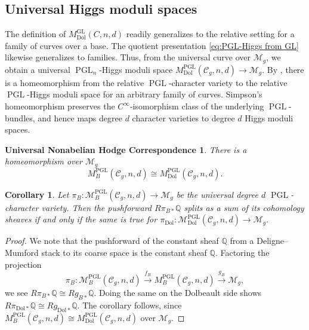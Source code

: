 \documentclass[11pt,reqno]{amsart}
\theoremstyle{plain} %
\newtheorem*{RNAHC}{Universal Nonabelian Hodge Correspondence}
\newtheorem{corollary}[theorem]{Corollary}
\theoremstyle{definition}
\newcommand{\QQ}{\mathbb{Q}}
\newcommand{\M}{\mathcal{M}}
\newcommand{\C}{\mathcal{C}}
\newcommand{\mc}{\mathcal}
\DeclareMathOperator{\GL}{GL}
\DeclareMathOperator{\PGL}{PGL}
\newcommand{\Dol}{\mathrm{Dol}}
\begin{document}
\subsection{Universal Higgs moduli spaces}
The definition of $M^{\GL}_{\Dol}(C,n,d)$ readily generalizes to the relative setting for a family of curves over a base. The quotient presentation \eqref{eq:PGL-Higgs from GL} likewise generalizes to families. Thus, from the universal curve over $\M_g$, we obtain a universal $\PGL_n$-Higgs moduli space $M^{\PGL}_{\Dol}(\mc C_g,n,d) \to \M_g.$ %
By \cite[Theorem~9.11 and Lemma~9.14]{Simpson-reps2}, there is a homeomorphism from the relative $\PGL$-character variety to the relative $\PGL$-Higgs moduli space for an arbitrary family of curves. Simpson's homeomorphism preserves the $C^\infty$-isomorphism class of the underlying $\PGL$-bundles, and hence maps degree $d$ character varieties to degree $d$ Higgs moduli spaces.


\begin{RNAHC} %
There is a homeomorphism  over $\M_g$ $$M_B^{\PGL}(\C_g, n, d) \cong M_\Dol^{\PGL}(\C_g,n,d).$$ %
\end{RNAHC}




\begin{corollary} \label{cor: switch to Dol}
    Let $\pi_B \colon \M^{\PGL}_B(\C_g,n,d) \to \M_g$ be the universal degree $d$ $\PGL$-character variety. Then the pushforward $R\pi_{B*} \QQ$ %
    splits as a sum of its cohomology sheaves if and only if the same is true for 
	$
		\pi_{\Dol}\colon \M^{\PGL}_{\Dol}(\C_g,n,d) \to \M_g. %
	$
\end{corollary}

\begin{proof}
    We note that the pushforward of the constant sheaf $\QQ$ from a Deligne--Mumford stack to its coarse space is the constant sheaf $\QQ$. Factoring the projection
    $$\pi_B\colon \M_B^{\PGL}(\C_g,n,d) \xrightarrow{f_B} M_B^{\PGL}(\C_g,n,d) \xrightarrow{g_B} \M_g,$$
    we see $R\pi_{B*} \QQ \cong Rg_{B*}\QQ$.
Doing the same on the Dolbeault side shows $R\pi_{\Dol *} \QQ \cong Rg_{\Dol *} \QQ.$ The corollary follows, since $M_B^{\PGL}(\C_g, n, d) \cong M_\Dol^{\PGL}(\C_g,n,d)$ over $\M_g$.
\end{proof}
\end{document}
